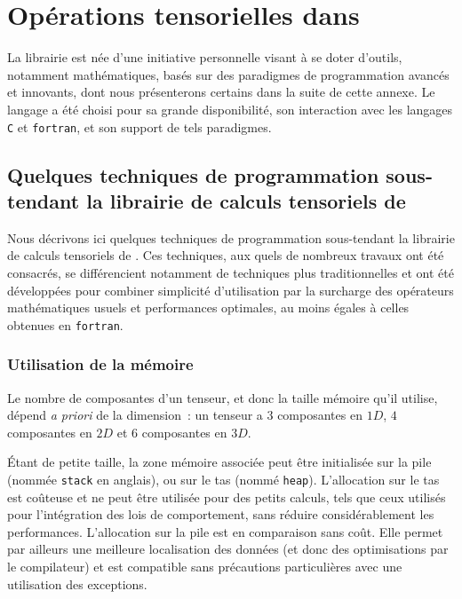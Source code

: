 \documentclass[rectoverso,pleiades,pstricks,leqno,anti]{texmf/note_technique_2010}
\newcommand{\fortran}{\texttt{fortran}}
\newcommand{\tfel}[1]{\index{tfel}{#1}{\texttt{#1}}}
\def\ifmonospace{\ifdim\fontdimen3\font=0pt }
\def\cpp{%
\ifmonospace%
    C++%
\else%
    C\kern-.1667em\raise.30ex\hbox{\smaller{++}}%
\fi%
\spacefactor1000 }
\begin{document}
\clearpage
\newpage
{}
\listetableaux
\listefigures

\appendix
\section{Opérations tensorielles dans \tfel{}}

La librairie \tfel{} est née d'une initiative personnelle visant à se
doter d'outils, notamment mathématiques, basés sur des paradigmes de
programmation avancés et innovants, dont nous présenterons certains
dans la suite de cette annexe. Le langage \cpp{} a été choisi pour sa
grande disponibilité, son interaction avec les langages \texttt{C} et
\texttt{fortran}, et son support de tels paradigmes.

\subsection{Quelques techniques de programmation sous-tendant la
  librairie de calculs tensoriels de \tfel{}}

Nous décrivons ici quelques techniques de programmation sous-tendant
la librairie de calculs tensoriels de \tfel{}. Ces techniques, aux
quels de nombreux travaux ont été consacrés, se différencient
notamment de techniques plus traditionnelles et ont été développées
pour combiner simplicité d'utilisation par la surcharge des opérateurs
mathématiques usuels et performances optimales, au moins égales à
celles obtenues en \fortran{}.

\subsubsection{Utilisation de la mémoire}

Le nombre de composantes d'un tenseur, et donc la taille mémoire qu'il
utilise, dépend {\em a priori} de la dimension~: un tenseur a \(3\)
composantes en \(1D\), \(4\) composantes en \(2D\) et \(6\)
composantes en \(3D\).

Étant de petite taille, la zone mémoire associée peut être initialisée
sur la pile (nommée \texttt{stack} en anglais), ou sur le tas (nommé
\texttt{heap}). L'allocation sur le tas est coûteuse et ne peut être
utilisée pour des petits calculs, tels que ceux utilisés pour
l'intégration des lois de comportement, sans réduire considérablement
les performances. L'allocation sur la pile est en comparaison sans
coût. Elle permet par ailleurs une meilleure localisation des données
(et donc des optimisations par le compilateur) et est compatible sans
précautions particulières avec une utilisation des exceptions.
\end{document}
